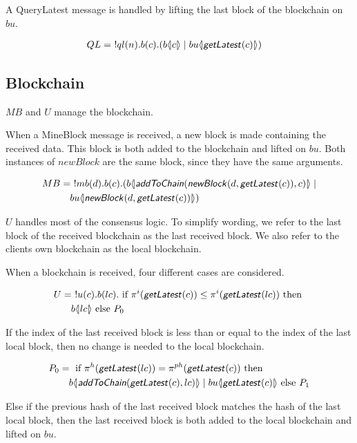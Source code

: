 A QueryLatest message is handled by lifting the last block of the blockchain on $bu$.

\begin{align*}
	QL &=\ !ql(n). b(c).(b \langle \! | c | \! \rangle \mid bu \langle \! | \text{\sffamily \textit{getLatest}\normalfont}(c) | \! \rangle)
\end{align*}

\subsection{Blockchain}

$MB$ and $U$ manage the blockchain.

When a MineBlock message is received, a new block is made containing the received data.
This block is both added to the blockchain and lifted on $bu$.
Both instances of $newBlock$ are the same block, since they have the same arguments.

\begin{align*}
    MB &=\ !mb(d). b(c).( b \langle \! | \text{\sffamily \textit{addToChain}\normalfont}(\text{\sffamily \textit{newBlock}\normalfont}(d,\text{\sffamily \textit{getLatest}\normalfont}(c)),c) | \! \rangle \mid \\
    &\quad bu \langle \! | \text{\sffamily \textit{newBlock}\normalfont}(d, \text{\sffamily \textit{getLatest}\normalfont}(c)) | \! \rangle)
\end{align*}

$U$ handles most of the consensus logic.
To simplify wording, we refer to the last block of the received blockchain as the last received block.
We also refer to the clients own blockchain as the local blockchain.

When a blockchain is received, four different cases are considered.

\begin{align*}
	U &=\ !u(c). b(lc). \text{ if }\pi^{i}( \text{\sffamily \textit{getLatest}\normalfont}(c)) \leq \pi^{i}(\text{\sffamily \textit{getLatest}\normalfont}(lc))\text{ then }\\
	&\quad b \langle \! | lc | \! \rangle\text{ else }P_0
\end{align*}

If the index of the last received block is less than or equal to the index of the last local block, then no change is needed to the local blockchain.

\begin{align*}
	P_0 &=\text{ if }\pi^{h}(\text{\sffamily \textit{getLatest}\normalfont}(lc))=\pi^{ph}(\text{\sffamily \textit{getLatest}\normalfont}(c))\text{ then }\\
	&\quad b \langle \! | \text{\sffamily \textit{addToChain}\normalfont}(\text{\sffamily \textit{getLatest}\normalfont}(c),lc) | \! \rangle \mid bu \langle \! | \text{\sffamily \textit{getLatest}\normalfont}(c) | \! \rangle\text{ else }P_1
\end{align*}

Else if the previous hash of the last received block matches the hash of the last local block, then the last received block is both added to the local blockchain and lifted on $bu$.


